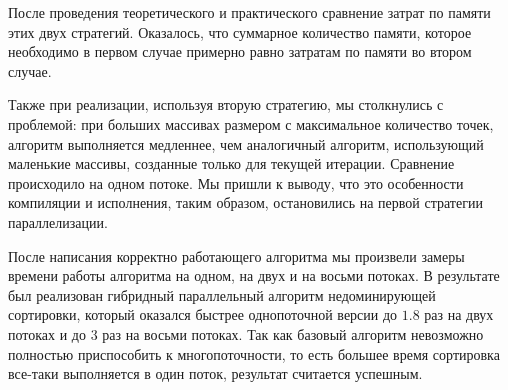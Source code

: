 После проведения теоретического и практического сравнение затрат по памяти этих двух стратегий. Оказалось, что суммарное количество памяти, которое необходимо в первом случае примерно равно затратам по памяти во втором случае. 

Также при реализации, используя вторую стратегию, мы столкнулись с проблемой: при больших массивах размером с максимальное количество точек, алгоритм выполняется медленнее, чем аналогичный алгоритм, использующий маленькие массивы, созданные только для текущей итерации. Сравнение происходило на одном потоке. Мы пришли к выводу, что это особенности компиляции и исполнения, таким образом, остановились на первой стратегии параллелизации. 

После написания корректно работающего алгоритма мы произвели замеры времени работы алгоритма на одном, на двух и на восьми потоках. В результате был реализован гибридный параллельный алгоритм недоминирующей сортировки, который оказался быстрее однопоточной версии до $1.8$ раз на двух потоках и до $3$ раз на восьми потоках. Так как базовый алгоритм невозможно полностью приспособить к многопоточности, то есть большее время сортировка все-таки выполняется в один поток, результат считается успешным.

